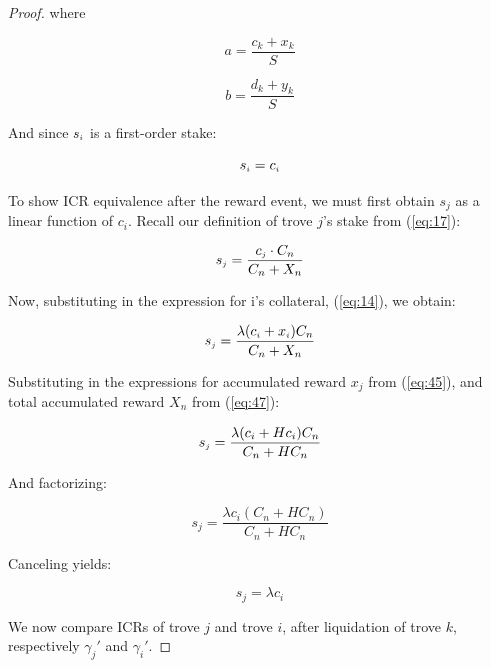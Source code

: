 \documentclass[reqno]{article}
\begin{document}
\begin{proof}
\bigskip
where

\begin{equation} \label{eq:20_a}
    a=\frac{c_k+x_k}{S}
\end{equation}

\begin{equation} \label{eq:20_b}
    b=\frac{d_k+y_k}{S}
\end{equation}

\bigskip
And since $s_\mathsmaller{i}$ is a first-order stake:

\begin{equation} \label{eq:21}
    s_\mathsmaller{i}=c_\mathsmaller{i}
\end{equation}

\bigskip
To show ICR equivalence after the reward event, we must first obtain $s_j$ as a linear function of $c_i$. Recall our definition of trove $j$’s stake from (\ref{eq:17}):

\begin{equation} 
    s_\mathsmaller{j}=\frac{c_\mathsmaller{j} \cdot C_n}{C_n+X_n}
\end{equation}

\bigskip
Now, substituting in the expression for i’s collateral, (\ref{eq:14}), we obtain:

\begin{equation} 
    s_\mathsmaller{j}=\frac{\lambda(c_\mathsmaller{i}+x_\mathsmaller{i})C_n}{C_n+X_n}
\end{equation}


\bigskip
Substituting in the expressions for accumulated reward $x_j$ from (\ref{eq:45}), and total accumulated reward $X_n$ from (\ref{eq:47}):

\begin{equation} 
    s_\mathsmaller{j}=\frac{\lambda(c_i+Hc_i)C_n}{C_n+HC_n}
\end{equation}

\bigskip
And factorizing:

\begin{equation} 
    s_j=\frac{\lambda c_i(C_n+HC_n)}{C_n+HC_n}
\end{equation}

\bigskip
Canceling yields:

\begin{equation} \label{eq:29}
    s_j=\lambda c_i
\end{equation}

\bigskip
We now compare ICRs of trove $j$ and trove $i$, after liquidation of trove $k$, respectively $\gamma_{j}'$ and $\gamma_{i}'$.


\end{proof}
\end{document}
